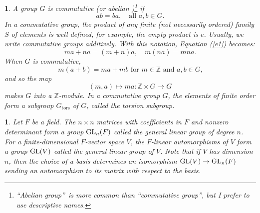 \documentclass[a4paper,11pt,final]{memoir}%
\newtheorem{plain}[X]{}
\theoremstyle{nonumberplain}
\begin{document}
\begin{plain}
\label{bd3d}A group $G$ is \emph{commutative}%
%
\/ (or \emph{abelian}%
%
\/)\footnote{\textquotedblleft Abelian group\textquotedblright\ is more common
than \textquotedblleft commutative group\textquotedblright, but I prefer to
use descriptive names.} if
\[
ab=ba,\quad\text{all }a,b\in G.
\]
In a commutative group, the product of any finite (not necessarily ordered)
family $S$ of elements is well defined, for example, the empty product is $e$.
Usually, we write commutative groups additively. With this notation, Equation
(\ref{e1}) becomes:%
\[
ma+na=(m+n)a,\quad m(na)=mna.
\]
When $G$ is commutative,
\[
m(a+b)=ma+mb\text{ for }m\in\mathbb{Z}{}\text{ and }a,b\in G\text{,}%
\]
and so the map%
\[
(m,a)\mapsto ma\colon\mathbb{Z}{}\times G\rightarrow G
\]
makes $G$ into a $\mathbb{Z}{}$-module. In a commutative group $G$, the
elements of finite order form a subgroup $G_{\text{tors}}$ of $G$, called the
\emph{torsion subgroup}.%
%

\end{plain}

\begin{plain}
\label{bd3e}Let $F$ be a field. The $n\times n$ matrices with coefficients in
$F$ and nonzero determinant form a group%
$\operatorname{GL}_{n}(F)$ called the \emph{general linear group of degree} $n$.%
For a finite-dimensional $F$-vector space $V$, the $F$-linear automorphisms of
$V$ form a group $\operatorname{GL}(V)$ called the \emph{general linear group of} $V$. Note
that if $V$ has dimension $n$, then the choice of a basis determines an
isomorphism $\operatorname{GL}(V)\rightarrow\operatorname{GL}_{n}(F)$ sending an automorphism to its
matrix with respect to the basis.
\end{plain}
\end{document}
